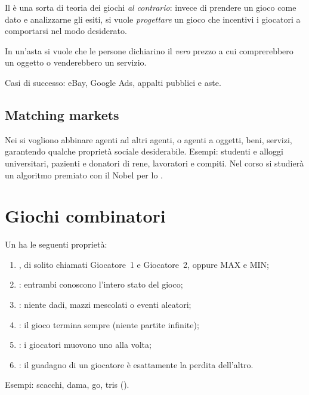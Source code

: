 Il  è una sorta di teoria dei giochi \emph{al contrario}: invece di
prendere un gioco come dato e analizzarne gli esiti, si vuole \emph{progettare} un gioco
che incentivi i giocatori a comportarsi nel modo desiderato.

\begin{esempio}[aste]
In un'asta si vuole che le persone dichiarino il \emph{vero} prezzo a cui comprerebbero
un oggetto o venderebbero un servizio.
\end{esempio}

Casi di successo: eBay, Google Ads, appalti pubblici e aste.

\subsection{Matching markets}

Nei  si vogliono abbinare agenti ad altri agenti, o agenti a
oggetti, beni, servizi, garantendo qualche proprietà sociale desiderabile.
Esempi: studenti e alloggi universitari, pazienti e donatori di rene, lavoratori e compiti.
Nel corso si studierà un algoritmo premiato con il Nobel per lo .

\section{Giochi combinatori}

\begin{definizione}
Un  ha le seguenti proprietà:
\begin{enumerate}
  \item {}, di solito chiamati Giocatore~1 e Giocatore~2, oppure MAX e MIN;
  \item {}: entrambi conoscono l'intero stato del gioco;
  \item {}: niente dadi, mazzi mescolati o eventi aleatori;
  \item {}: il gioco termina sempre (niente partite infinite);
  \item {}: i giocatori muovono uno alla volta;
  \item {}: il guadagno di un giocatore è esattamente la perdita dell'altro.
\end{enumerate}
\end{definizione}
Esempi: scacchi, dama, go, tris ().

